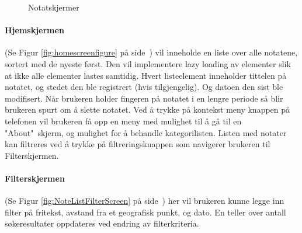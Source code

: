 \documentclass[a4paper, 12pt]{article}
\begin{document}
\begin{figure}[hb]
{		\label{fig:NoteEditPageScreen}}
		\quad
	\caption{Notatskjermer}
\label{fig:notescreens}
\end{figure}


\paragraph{Hjemskjermen} (Se Figur \ref{fig:homescreenfigure} på side~\pageref{fig:homescreenfigure}) vil inneholde en liste over alle notatene, sortert med de nyeste først. Den vil implementere lazy loading av elementer slik at ikke alle elementer lastes samtidig. Hvert listeelement inneholder tittelen på notatet, og stedet den ble registrert (hvis tilgjengelig). Og datoen den sist ble modifisert. Når brukeren holder fingeren på notatet i en lengre periode så blir brukeren spurt om å slette notatet. Ved å trykke på kontekst meny knappen på telefonen vil brukeren få opp en meny med mulighet til å gå til en "About"~skjerm, og mulighet for å behandle kategorilisten. Listen med notater kan filtreres ved å trykke på filtreringsknappen som navigerer brukeren til Filterskjermen.

\paragraph{Filterskjermen} (Se Figur \ref{fig:NoteListFilterScreen} på side~\pageref{fig:NoteListFilterScreen}) her vil brukeren kunne legge inn filter på fritekst, avstand fra et geografisk punkt, og dato. En teller over antall søkeresultater oppdateres ved endring av filterkriteria.
\end{document}
